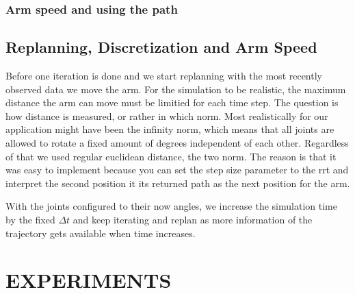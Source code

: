 \documentclass[letterpaper, 10 pt, conference]{ieeeconf}  %
\begin{document}

\subsubsection{Arm speed and using the path}



\subsection{Replanning, Discretization and Arm Speed}

Before one iteration is done and we start replanning with the most
recently observed data we move the arm. For the simulation to be
realistic, the  maximum distance the arm can move must be limitied for
each time step. The question is how distance is measured, or rather in
which norm. Most realistically for our application might have been the
infinity norm, which means that all joints are allowed to rotate a fixed
amount of degrees independent of each other. Regardless of that we used
regular euclidean distance, the two norm. The reason is that it was easy
to implement because you can set the step size parameter to the rrt and
interpret the second position it its returned path as the next position
for the arm.

With the joints configured to their now angles, we increase the
simulation time by the fixed $\Delta t$ and keep iterating and replan as
more information of the trajectory gets available when time increases.

\section{EXPERIMENTS}
\end{document}

